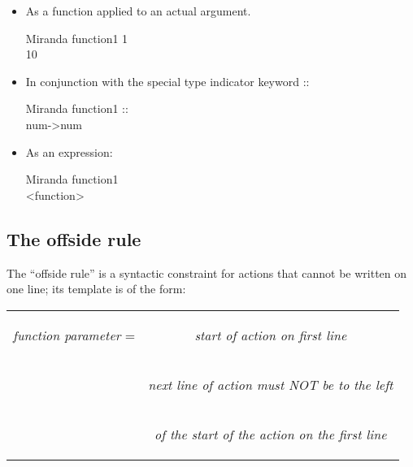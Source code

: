 \documentclass[11pt]{article}
\begin{document}
\begin{itemize}
\item As a function applied to an actual argument.

\begin{tcolorbox}
Miranda function1 1\\
10
\end{tcolorbox}

\item In conjunction with the special type indicator keyword ::

\begin{tcolorbox}
Miranda function1 ::\\
num->num
\end{tcolorbox}

\item As an expression:

\begin{tcolorbox}
Miranda function1 \\
<function>
\end{tcolorbox}

\end{itemize}

\subsection{The offside rule}
The “offside rule” is a syntactic constraint for actions that cannot be written on
one line; its template is of the form:

\begin{center}
\begin{tabular}{c c}

\textit{ function parameter} = &\begin{flushleft}  \textit{start of action on first line} \end{flushleft}  \\
 &\begin{flushleft}
 
 \textit{next line of action must NOT be to the left}\end{flushleft}\\
 &\begin{flushleft}
 
 \textit{of the start of the action on the first line} \end{flushleft}
 
\end{tabular}
\end{center}
\end{document}
